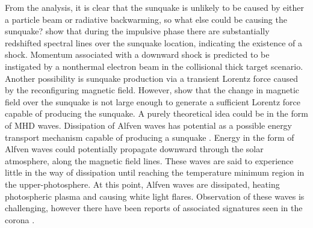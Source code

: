 From the analysis, it is clear that the sunquake is unlikely to be caused by either a particle beam or radiative backwarming, so what else could be causing the sunquake? \cite{2015ApJ...812...35M} show that during the impulsive phase there are substantially redshifted spectral lines over the sunquake location, indicating the existence of a shock. Momentum associated with a downward shock is predicted to be instigated by a nonthermal electron beam in the collisional thick target scenario. Another possibility is sunquake production via a transient Lorentz force caused by the reconfiguring magnetic field. However, \cite{2014ApJ...796...85J} show that the change in magnetic field over the sunquake is not large enough to generate a sufficient Lorentz force capable of producing the sunquake. A purely theoretical idea could be in the form of MHD waves. Dissipation of Alfven waves \citep{1982SoPh...80...99E} has potential as a possible energy transport mechanism capable of producing a sunquake \citep{2015ApJ...812...35M}. Energy in the form of Alfven waves could potentially propagate downward through the solar atmosphere, along the magnetic field lines. These waves are said to experience little in the way of dissipation until reaching the temperature minimum region in the upper-photosphere. At this point, Alfven waves are dissipated, heating photospheric plasma and causing white light flares. Observation of these waves is challenging, however there have been reports of associated signatures seen in the corona \citep{2009A&A...501L..15B}. 

